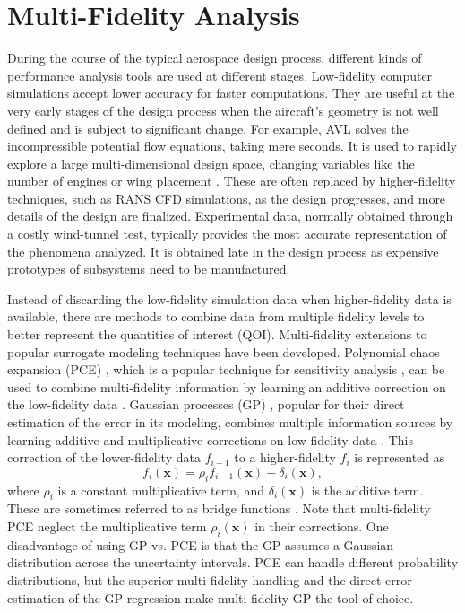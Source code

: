\section{Multi-Fidelity Analysis} \label{intro_mf}

During the course of the typical aerospace design process, different kinds of performance analysis tools are used at different stages.
Low-fidelity computer simulations accept lower accuracy for faster computations.
They are useful at the very early stages of the design process when the aircraft's geometry is not well defined and is subject to significant change.
For example, AVL \cite{drela2008athena} solves the incompressible potential flow equations, taking mere seconds.
It is used to rapidly explore a large multi-dimensional design space, changing variables like the number of engines or wing placement \cite{botero2016suave,botero2019generative}.
These are often replaced by higher-fidelity techniques, such as RANS CFD simulations, as the design progresses, and more details of the design are finalized.
Experimental data, normally obtained through a costly wind-tunnel test, typically provides the most accurate representation of the phenomena analyzed.
It is obtained late in the design process as expensive prototypes of subsystems need to be manufactured.

Instead of discarding the low-fidelity simulation data when higher-fidelity data is available, there are methods to combine data from multiple fidelity levels to better represent the quantities of interest (QOI).
Multi-fidelity extensions to popular surrogate modeling techniques have been developed.
Polynomial chaos expansion (PCE) \cite{oladyshkin2012data,blatman2011adaptive}, which is a popular technique for sensitivity  analysis \cite{sudret2008global,crestaux2009polynomial}, can be used to combine multi-fidelity information by learning an additive correction on the low-fidelity data \cite{ng2012multifidelity, palar2018global}.
Gaussian processes (GP) \cite{krige1951statistical,matheron1963principles,rasmussen_gaussian_2006}, popular for their direct estimation of the error in its modeling, combines multiple information sources by learning additive and multiplicative corrections on low-fidelity data \cite{kennedy_predicting_2000}.
This correction of the lower-fidelity data $f_{i-1}$ to a higher-fidelity $f_i$ is represented as
\begin{equation}
    f_i(\mathbf{x}) = \rho_i f_{i-1}(\mathbf{x}) + \delta_i(\mathbf{x}),
\end{equation}
where $\rho_i$ is a constant multiplicative term, and $\delta_i(\mathbf{x})$ is the additive term.
These are sometimes referred to as bridge functions \cite{han_improving_2013}.
Note that multi-fidelity PCE neglect the multiplicative term $\rho_i(\mathbf{x})$ in their corrections.
One disadvantage of using GP vs. PCE is that the GP assumes a Gaussian distribution across the uncertainty intervals. 
PCE can handle different probability distributions, but the superior multi-fidelity handling and the direct error estimation of the GP regression make multi-fidelity GP the tool of choice.

